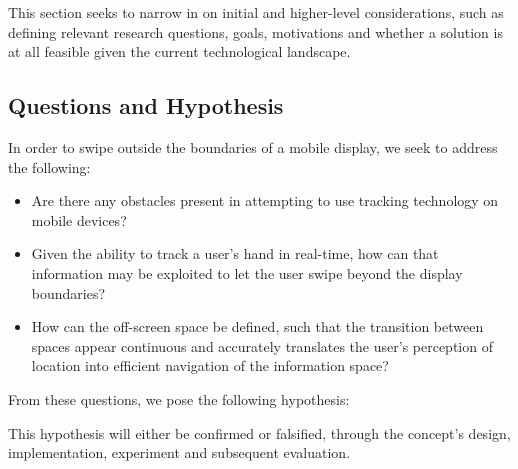
\noi
This section seeks to narrow in on initial and higher-level considerations, such as defining relevant research questions, goals, motivations and whether a solution is at all feasible given the current technological landscape.\\


\subsection{Questions and Hypothesis}

In order to swipe outside the boundaries of a mobile display, we seek to address the following:

\begin{itemize}
	\item Are there any obstacles present in attempting to use tracking technology on mobile devices? 
	\item Given the ability to track a user's hand in real-time, how can that information may be exploited to let the user swipe beyond the display boundaries?
	\item How can the off-screen space be defined, such that the transition between spaces appear continuous and accurately translates the user's perception of location into efficient navigation of the information space?
\end{itemize}
From these questions, we pose the following hypothesis:
\begin{displayquote}
\end{displayquote}
This hypothesis will either be confirmed or falsified, through the concept's design, implementation, experiment and subsequent evaluation.

